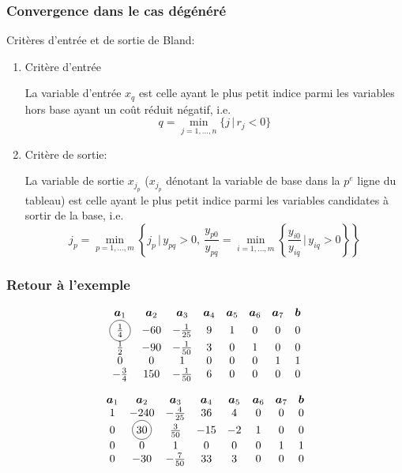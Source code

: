 \documentclass[t,usepdftitle=false]{beamer}
\newcommand*\circled[1]{\tikz[baseline=(char.base)]{
    \node[shape=circle,draw,inner sep=2pt] (char) {#1};}}
\def\ba{\boldsymbol{a}}
\def\bb{\boldsymbol{b}}
\begin{document}
\begin{frame}
	\frametitle{Convergence dans le cas dégénéré}
	
	Critères d'entrée et de sortie de Bland:
	\begin{enumerate}
		\item
		{\color{red}Critère d'entrée}
		
		La variable d'entrée $x_q$ est celle ayant le plus petit indice parmi les variables hors base ayant un coût réduit négatif, i.e.
		$$
		q = \min_{j = 1,\ldots,n} \{ j \,|\, r_j < 0 \}
		$$
		\item
		{\color{red}Critère de sortie}:
		
		La variable de sortie $x_{j_p}$ ($x_{j_p}$ dénotant la variable de base dans la $p^e$  ligne du tableau) est celle ayant le plus petit indice parmi les variables candidates à sortir de la base, i.e.
		$$
		j_p = \min_{ p = 1,\ldots,m } \left\{ j_p \,\bigg|\, y_{pq} > 0,\ 
		\frac{y_{p0}}{y_{pq}} = \min_{i = 1,\ldots,m}
		\left\{ \frac{y_{i0}}{y_{iq}} \,\bigg|\, y_{iq} > 0 \right\}
		\right\}
		$$
		
	\end{enumerate}
	
\end{frame}

	
	

\begin{frame}
	\frametitle{Retour à l'exemple}
	
	\[
	\begin{matrix}
		\ba_1 & \ba_2 & \ba_3 & \ba_4 & \ba_5 &\ba_6 &\ba_7 & \bb \\
		\circled{$\frac{1}{4}$} & -60 & -\frac{1}{25} & 9 & 1 & 0 & 0 & 0 \\
		\frac{1}{2} & -90 & -\frac{1}{50} & 3 & 0 & 1 & 0 & 0 \\
		0 & 0 & 1 & 0 & 0 & 0 & 1 & 1 \\
		-\frac{3}{4} & 150 & -\frac{1}{50} & 6 & 0 & 0 & 0 & 0
	\end{matrix}
	\]
	
	\[
	\begin{matrix}
		\ba_1 & \ba_2 & \ba_3 & \ba_4 & \ba_5 &\ba_6 &\ba_7 & \bb \\
		1 & -240 & -\frac{4}{25} & 36 & 4 & 0 & 0 & 0 \\
		0 & \circled{30} & \frac{3}{50} & -15 & -2 & 1 & 0 & 0 \\
		0 & 0 & 1 & 0 & 0 & 0 & 1 & 1 \\
		0 & -30 & -\frac{7}{50} & 33 & 3 & 0 & 0 & 0
	\end{matrix}
	\]
	
\end{frame}
\end{document}
